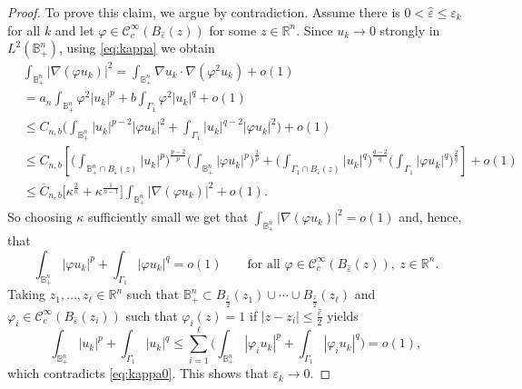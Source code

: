 \documentclass[10pt,a4paper]{amsart}
\def\D{\mathbb{B}^n_+}
\def\cC{\mathcal{C}}
\def\eps{\varepsilon}
\def\rn{\mathbb{R}^n}
\def\vp{\varphi}
\def\what{\widehat}
\begin{document}
\begin{proof}
To prove this claim, we argue by contradiction. Assume there is $0<\what{\eps}\leq\eps_k$ for all $k$ and let $\vp\in\cC^\infty_c(B_{\what{\eps}}(z))$ for some $z\in\rn$. Since $u_k\to0$ strongly in $L^2(\D)$, using \eqref{eq:kappa} we obtain
\begin{align} \label{eq:eps_to_0}
&\int_{\D}|\nabla(\vp u_k)|^2=\int_{\D}\nabla u_k\cdot\nabla(\vp^2 u_k) + o(1) \nonumber \\
&=a_n\int_{\D}\vp^2|u_k|^p+b\int_{\Gamma_1}\vp^2|u_k|^q+o(1)  \nonumber \\
&\leq C_{n,b}\Big(\int_{\D}|u_k|^{p-2}|\vp u_k|^2+\int_{\Gamma_1}|u_k|^{q-2}|\vp u_k|^2\Big)+o(1) \nonumber  \\
&\leq C_{n,b}\left[\Big(\int_{\D\cap B_{\what{\eps}}(z)}|u_k|^p\Big)^\frac{p-2}{p}\Big(\int_{\D}|\vp u_k|^p\Big)^\frac{2}{p} + \Big(\int_{\Gamma_1\cap B_{\what{\eps}}(z)}|u_k|^q\Big)^\frac{q-2}{q}\Big(\int_{\Gamma_1}|\vp u_k|^q\Big)^\frac{2}{q}\right] + o(1) \nonumber  \\
&\leq \overline{C}_{n,b} \Big[\kappa^\frac{2}{n} + \kappa^\frac{1}{n-1}\Big]\int_{\D}|\nabla(\vp u_k)|^2 + o(1).
\end{align}
So choosing $\kappa$ sufficiently small we get that $\int_{\D}|\nabla(\vp u_k)|^2 = o(1)$ and, hence, that
$$\int_{\D}|\vp u_k|^p+\int_{\Gamma_1}|\vp u_k|^q=o(1)\qquad\text{for all \ }\vp\in\cC^\infty_c(B_{\what{\eps}}(z)), \ z\in\rn.$$
Taking $z_1,\ldots,z_\ell\in\rn$ such that $\D\subset B_\frac{\what\eps}{2}(z_1)\cup\cdots\cup B_\frac{\what\eps}{2}(z_\ell)$ and $\vp_i\in\cC^\infty_c(B_{\what{\eps}}(z_i))$ such that $\vp_i(z)=1$ if $|z-z_i|\leq\frac{\what\eps}{2}$ yields
$$\int_{\D}|u_k|^p+\int_{\Gamma_1}|u_k|^q\leq\sum_{i=1}^\ell\Big(\int_{\D}|\vp_iu_k|^p+\int_{\Gamma_1}|\vp_iu_k|^q\Big)=o(1),$$
which contradicts \eqref{eq:kappa0}. This shows that $\eps_k\to 0$.


\end{proof}
\end{document}
